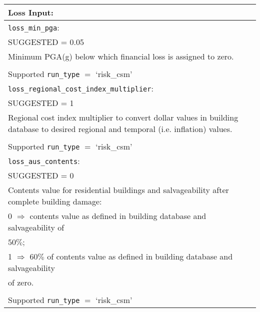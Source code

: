 \vspace{2em}
\begin{tabular}{|p{\textwidth}|}
\hline
\vspace{0.3em} \noindent \Large \textbf{Loss Input:} \normalsize \\
\hline \vspace{0.1em} \texttt{loss\_min\_pga}: \\
SUGGESTED = 0.05 \\
Minimum PGA(g) below which financial loss is assigned to zero. \\
\\
Supported \texttt{run\_type} $=$ `risk\_csm' \\
\hline
\vspace{0.1em} \texttt{loss\_regional\_cost\_index\_multiplier}: \\
SUGGESTED = 1 \\
Regional cost index multiplier to convert dollar values in building
database to desired regional and temporal (i.e. inflation) values.\\
\\
Supported \texttt{run\_type} $=$ `risk\_csm' \\
\hline \vspace{0.1em} \texttt{loss\_aus\_contents}: \\
SUGGESTED = 0 \\
Contents value for residential buildings and salvageability after complete building damage:   \\
\hspace{0.5em} 0 $\Rightarrow$ contents value as defined in building
  database and salvageability of \\
  \hspace{2.5em} $50\%$;\\
\hspace{0.5em} 1 $\Rightarrow$ $60\%$ of contents value as defined in
building database and salvageability \\
\hspace{2.5em} of zero.\\
\\
Supported \texttt{run\_type} $=$ `risk\_csm' \\
  \hline
 \end{tabular}
 
